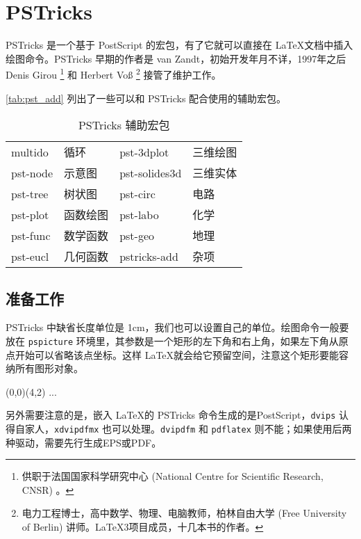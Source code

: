 \chapter{PSTricks}
\label{sec:pstricks}

PSTricks 是一个基于 PostScript 的宏包，有了它就可以直接在 \LaTeX 文档中插入绘图命令。PSTricks 早期的作者是 van Zandt\indexVanZandt ，初始开发年月不详，1997年之后 Denis Girou\indexGirou{} \footnote{供职于法国国家科学研究中心 (National Centre for Scientific Research, CNSR) 。} 和 Herbert Voß\indexVoss{} \footnote{电力工程博士，高中数学、物理、电脑教师，柏林自由大学 (Free University of Berlin) 讲师。\LaTeX{}3项目成员，十几本书的作者。} 接管了维护工作。

\autoref{tab:pst_add} 列出了一些可以和 PSTricks 配合使用的辅助宏包。

\begin{table}[htbp]
\caption{PSTricks 辅助宏包}
\label{tab:pst_add}
\centering
\begin{tabular}{llll}
  \toprule
  multido & 循环      & pst-3dplot & 三维绘图 \\
  pst-node & 示意图   & pst-solides3d & 三维实体 \\
  pst-tree & 树状图   & pst-circ & 电路 \\
  pst-plot & 函数绘图 & pst-labo & 化学 \\
  pst-func & 数学函数 & pst-geo & 地理 \\
  pst-eucl & 几何函数 & pstricks-add & 杂项 \\
  \bottomrule
\end{tabular}
\end{table}

\section{准备工作}
\label{sec:pst_setup}

PSTricks 中缺省长度单位是 1cm，我们也可以设置自己的单位。绘图命令一般要放在 \texttt{pspicture} 环境里，其参数是一个矩形的左下角和右上角，如果左下角从原点开始可以省略该点坐标。这样 \LaTeX 就会给它预留空间，注意这个矩形要能容纳所有图形对象。

\begin{Code}[]
\begin{pspicture}(0,0)(4,2)
...
\end{pspicture}
\end{Code}

另外需要注意的是，嵌入 \LaTeX 的 PSTricks 命令生成的是PostScript，\texttt{dvips} 认得自家人，\texttt{xdvipdfmx} 也可以处理。\texttt{dvipdfm} 和 \texttt{pdflatex} 则不能；如果使用后两种驱动，需要先行生成EPS或PDF。


